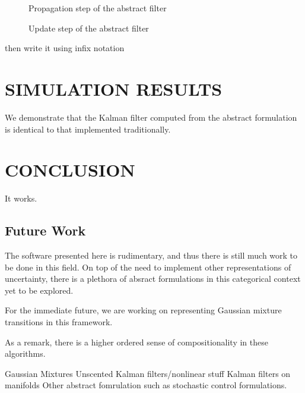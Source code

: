 \documentclass[letterpaper, 10 pt, conference]{ieeeconf}  %
\begin{document}
\begin{figure}[thpb]
    \framebox{\parbox{3in}{\centering}}
    \label{propagate-string}
    \caption{Propagation step of the abstract filter}
\end{figure}

\begin{figure}[thpb]
    \framebox{\parbox{3in}{\centering}}
    \label{update-string}
    \caption{Update step of the abstract filter}
\end{figure}

then write it using infix notation

\section{SIMULATION RESULTS}

We demonstrate that the Kalman filter computed from the abstract formulation is identical to that implemented traditionally. 

\section{CONCLUSION}
It works.

\subsection{Future Work}

The software presented here is rudimentary, and thus there is still much work to be done in this field.
On top of the need to implement other representations of uncertainty, there is a plethora of absract formulations in this categorical context yet to be explored.

For the immediate future, we are working on representing Gaussian mixture transitions in this framework.

As a remark, there is a higher ordered sense of compositionality in these algorithms.

Gaussian Mixtures
Unscented Kalman filters/nonlinear stuff
Kalman filters on manifolds
Other abstract fomrulation such as stochastic control formulations.
\end{document}
